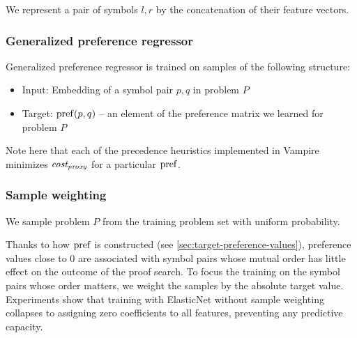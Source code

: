 We represent a pair of symbols \(l, r\) by the concatenation of their feature vectors.


\subsubsection{Generalized preference regressor}

Generalized preference regressor is trained on samples of the following structure:

\begin{itemize}
	\item Input: Embedding of a symbol pair \(p, q\) in problem \(P\)
	\item Target: \(\operatorname{pref}(p, q)\) -- an element of the preference matrix we learned for problem \(P\)
\end{itemize}

Note here that each of the precedence heuristics implemented in Vampire
minimizes \(\operatorname{\mathit{cost_{proxy}}}\) for a particular \(\operatorname{pref}\).


\subsubsection{Sample weighting}

We sample problem \(P\) from the training problem set with uniform probability.

Thanks to how \(\operatorname{pref}\) is constructed (see \autoref{sec:target-preference-values}),
preference values close to 0 are associated with symbol pairs whose mutual order has little effect
on the outcome of the proof search.
To focus the training on the symbol pairs whose order matters,
we weight the samples by the absolute target value.
Experiments show that training with ElasticNet without sample weighting
collapses to assigning zero coefficients to all features,
preventing any predictive capacity.

